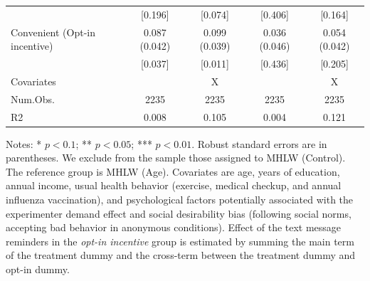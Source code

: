 \documentclass[
    a4paper
]{article}
\begin{document}
\begin{table}
\begin{threeparttable}
\begin{tabular}[t]{lcccc}
\hspace{1em} & {}[\num{0.196}] & {}[\num{0.074}] & {}[\num{0.406}] & {}[\num{0.164}]\\
\hspace{1em}Convenient (Opt-in incentive) & \num{0.087} (\num{0.042}) & \num{0.099} (\num{0.039}) & \num{0.036} (\num{0.046}) & \num{0.054} (\num{0.042})\\
\hspace{1em} & {}[\num{0.037}] & {}[\num{0.011}] & {}[\num{0.436}] & {}[\num{0.205}]\\
\midrule
Covariates &  & X &  & X\\
Num.Obs. & \num{2235} & \num{2235} & \num{2235} & \num{2235}\\
R2 & \num{0.008} & \num{0.105} & \num{0.004} & \num{0.121}\\
\bottomrule
\end{tabular}
\begin{tablenotes}
\item Notes: * $p < 0.1$; ** $p < 0.05$; *** $p < 0.01$. Robust standard errors are in parentheses. We exclude from the sample those assigned to MHLW (Control). The reference group is MHLW (Age). Covariates are age, years of education, annual income, usual health behavior (exercise, medical checkup, and annual influenza vaccination), and psychological factors potentially associated with the experimenter demand effect and social desirability bias (following social norms, accepting bad behavior in anonymous conditions). Effect of the text message reminders in the \emph{opt-in incentive} group is estimated by summing the main term of the treatment dummy and the cross-term between the treatment dummy and opt-in dummy.
\end{tablenotes}
\end{threeparttable}
\end{table}
\end{document}
